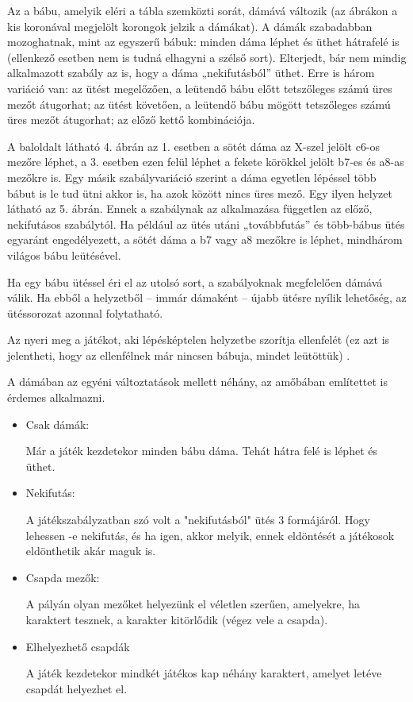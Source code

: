 Az a bábu, amelyik eléri a tábla szemközti sorát, dámává változik (az ábrákon a kis koronával megjelölt korongok jelzik a dámákat). A dámák szabadabban mozoghatnak, mint az egyszerű bábuk: minden dáma léphet és üthet hátrafelé is (ellenkező esetben nem is tudná elhagyni a szélső sort).
Elterjedt, bár nem mindig alkalmazott szabály az is, hogy a dáma „nekifutásból” üthet. Erre is három variáció van:
az ütést megelőzően, a leütendő bábu előtt tetszőleges számú üres mezőt átugorhat;
az ütést követően, a leütendő bábu mögött tetszőleges számú üres mezőt átugorhat;
az előző kettő kombinációja.

A baloldalt látható 4. ábrán az 1. esetben a sötét dáma az X-szel jelölt c6-os mezőre léphet, a 3. esetben ezen felül léphet a fekete körökkel jelölt b7-es és a8-as mezőkre is.
Egy másik szabályvariáció szerint a dáma egyetlen lépéssel több bábut is le tud ütni akkor is, ha azok között nincs üres mező. Egy ilyen helyzet látható az 5. ábrán. Ennek a szabálynak az alkalmazása független az előző, nekifutásos szabálytól. Ha például az ütés utáni „továbbfutás” és több-bábus ütés egyaránt engedélyezett, a sötét dáma a b7 vagy a8 mezőkre is léphet, mindhárom világos bábu leütésével.

Ha egy bábu ütéssel éri el az utolsó sort, a szabályoknak megfelelően dámává válik. Ha ebből a helyzetből – immár dámaként – újabb ütésre nyílik lehetőség, az ütéssorozat azonnal folytatható.

Az nyeri meg a játékot, aki lépésképtelen helyzetbe szorítja ellenfelét (ez azt is jelentheti, hogy az ellenfélnek már nincsen bábuja, mindet leütöttük) \cite{checkers-rules}.



A dámában az egyéni változtatások mellett néhány, az amőbában említettet is érdemes alkalmazni.
\begin{itemize}
	\item Csak dámák:
	
	Már a játék kezdetekor minden bábu dáma. Tehát hátra felé is léphet és üthet.
	\item Nekifutás:
	
	A játékszabályzatban szó volt a "nekifutásból" ütés 3 formájáról. Hogy lehessen -e nekifutás, és ha igen, akkor melyik, ennek eldöntését a játékosok eldönthetik akár maguk is.
	
	\item Csapda mezők:
	
	A pályán olyan mezőket helyezünk el véletlen szerűen, amelyekre, ha karaktert tesznek, a karakter kitörlődik (végez vele a csapda).
	
	\item Elhelyezhető csapdák
	
	A játék kezdetekor mindkét játékos kap néhány karaktert, amelyet letéve csapdát helyezhet el.	
\end{itemize}


